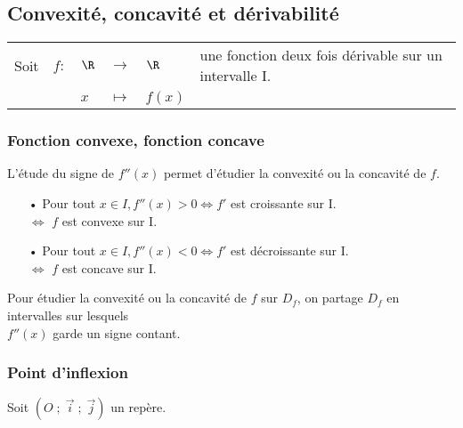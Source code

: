 \vspace*{-5cm}

\newpage

\subsection{Convexité, concavité et dérivabilité}

\begin{tabular}{llllll}
Soit & $f:$ & $\R$ & $\longrightarrow$ & $\R$ & une fonction deux fois dérivable sur un intervalle I. \\
& & $x$ & $\longmapsto$ & $f(x)$ & 
\end{tabular}

\subsubsection{Fonction convexe, fonction concave}

L'étude du signe de $f''(x)$ permet d'étudier la convexité ou la concavité de $f$. \\

\begin{itemize}
\item[•] Pour tout $x \in I, f''(x) > 0 \Longleftrightarrow f'$ est croissante sur I. \\
\hspace*{3.8cm} $\Longleftrightarrow$ $f$ est convexe sur I. \\
\item[•] Pour tout $x \in I, f''(x) < 0 \Longleftrightarrow f'$ est décroissante sur I. \\
\hspace*{3.8cm} $\Longleftrightarrow$ $f$ est concave sur I.
\end{itemize}

\vspace*{.3cm}

Pour étudier la convexité ou la concavité de $f$ sur $D_f$, on partage $D_f$ en intervalles sur lesquels \\ $f''(x)$ garde un signe contant. 

\subsubsection{Point d'inflexion}

Soit $\left(O \; ; \; \overrightarrow{i} \; ; \; \overrightarrow{j}\right)$ un repère. \\

